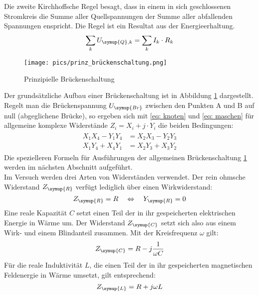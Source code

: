 Die zweite Kirchhoffsche Regel besagt, dass in einem in sich geschlossenen Stromkreis
die Summe aller Quellspannungen der Summe aller abfallenden
Spannungen enspricht. Die Regel ist ein Resultat aus der Energieerhaltung.
\begin{equation}
  \sum_k U_{\symup{Q},k} = \sum_k I_k \cdot R_k
  \label{eq: maschen}
\end{equation}
\begin{figure}
  \centering
  \texttt{[image: pics/prinz\_brückenschaltung.png]}
  \caption{Prinzipielle Brückenschaltung\cite{anleitung302}}
  \label{fig: prinzbrücke}
\end{figure}
Der grundsätzliche Aufbau einer Brückenschaltung ist in Abbildung \ref{fig: prinzbrücke} dargestellt. Regelt man die Brückenspannung $U_{\symup{Br}}$ %
zwischen den Punkten A und B auf null (abgeglichene Brücke), so ergeben sich mit \eqref{eq: knoten} und \eqref{eq: maschen}
für allgemeine komplexe Widerstände ${Z}_i = X_i + j \cdot Y_i$ die
beiden Bedingungen:
\begin{align}
  \begin{aligned}
    X_1 X_4 - Y_1 Y_4 &= X_2 X_3 - Y_2 Y_3 \\
    X_1 Y_4 + X_4 Y_1 &= X_2 Y_3 + X_3 Y_2
  \end{aligned}
  \label{eq: widerstandsbedingungen}
\end{align}
Die spezielleren Formeln für Ausführungen der allgemeinen Brückenschaltung \ref{fig: prinzbrücke} werden im nächsten Abschnitt aufgeführt.\\
Im Versuch werden drei Arten von Widerständen verwendet. Der rein ohmsche Widerstand
$Z_{\symup{R}}$ verfügt lediglich über einen Wirkwiderstand:
\begin{equation}
 Z_{\symup{R}} = R \quad \Leftrightarrow \quad Y_{\symup{R}} = 0
\end{equation}
Eine reale Kapazität $C$ setzt einen Teil der in ihr gespeicherten elektrischen Energie
in Wärme um. Der Widerstand $Z_{\symup{C}}$ setzt sich also aus einem Wirk- und einem Blindanteil zusammen. Mit der Kreisfrequenz $\omega$ gilt:
\begin{equation}
  Z_{\symup{C}} = R - j \frac{1}{\omega C}
\end{equation}
Für die reale Induktivität $L$, die einen Teil der in ihr
gespeicherten magnetischen Feldenergie in Wärme umsetzt, gilt entsprechend:
\begin{equation}
  Z_{\symup{L}} = R + j \omega L
\end{equation}
